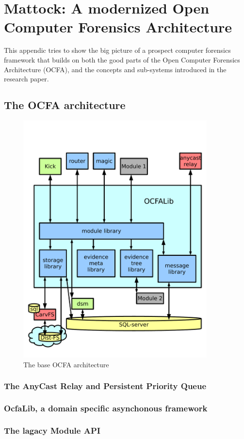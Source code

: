 \chapter{Mattock: A modernized Open Computer Forensics Architecture}
This appendic tries to show the big picture of a prospect computer forensics framework that builds on both the good parts of the Open Computer Forensics Architecture (OCFA), and the concepts and sub-systems introduced in the research paper.  
\section{The OCFA architecture}
\begin{figure}
\centering
\includegraphics[width=100mm]{mattock/libraryview.pdf}
\caption{The base OCFA architecture}
\label{fig:FlowInOut}
\end{figure}
\subsection{The AnyCast Relay and Persistent Priority Queue}
\subsection{OcfaLib, a domain specific asynchonous framework}
\subsection{The lagacy Module API}
